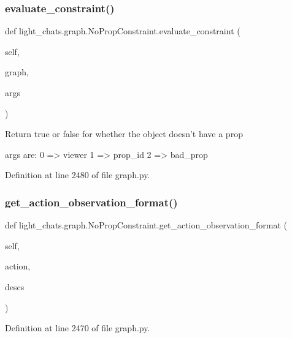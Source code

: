 \subsubsection{\texorpdfstring{evaluate\+\_\+constraint()}{evaluate\_constraint()}}
{\footnotesize\ttfamily def light\+\_\+chats.\+graph.\+No\+Prop\+Constraint.\+evaluate\+\_\+constraint (\begin{DoxyParamCaption}\item[{}]{self,  }\item[{}]{graph,  }\item[{}]{args }\end{DoxyParamCaption})}

\begin{DoxyVerb}Return true or false for whether the object doesn't have a prop

args are:
    0 => viewer
    1 => prop_id
    2 => bad_prop
\end{DoxyVerb}
 

Definition at line 2480 of file graph.\+py.

\mbox{\label{classlight__chats_1_1graph_1_1NoPropConstraint_a7d3ef98c6d1eea452e44c426a9498015}} 
\subsubsection{\texorpdfstring{get\+\_\+action\+\_\+observation\+\_\+format()}{get\_action\_observation\_format()}}
{\footnotesize\ttfamily def light\+\_\+chats.\+graph.\+No\+Prop\+Constraint.\+get\+\_\+action\+\_\+observation\+\_\+format (\begin{DoxyParamCaption}\item[{}]{self,  }\item[{}]{action,  }\item[{}]{descs }\end{DoxyParamCaption})}



Definition at line 2470 of file graph.\+py.



